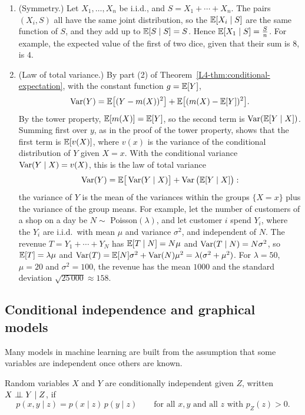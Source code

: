 \begin{example}\label{L4-ex:total-variance}
    \begin{enumerate}
        \item (Symmetry.) Let $X_1, \ldots, X_n$ be i.i.d., and $S = X_1 + \cdots + X_n$. The pairs $(X_i, S)$ all have the same joint distribution, so the $\mathbb{E}[X_i \mid S]$ are the same function of $S$, and they add up to $\mathbb{E}[S \mid S] = S$. Hence $\mathbb{E}[X_1 \mid S] = \frac{S}{n}$. For example, the expected value of the first of two dice, given that their sum is $8$, is $4$.
        \item (Law of total variance.) By part (2) of Theorem~\ref{L4-thm:conditional-expectation}, with the constant function $g = \mathbb{E}[Y]$,
        \[\operatorname{Var}(Y) = \mathbb{E}\big[(Y - m(X))^2\big] + \mathbb{E}\big[(m(X) - \mathbb{E}[Y])^2\big].\]
        By the tower property, $\mathbb{E}[m(X)] = \mathbb{E}[Y]$, so the second term is $\operatorname{Var}(\mathbb{E}[Y \mid X])$. Summing first over $y$, as in the proof of the tower property, shows that the first term is $\mathbb{E}[v(X)]$, where $v(x)$ is the variance of the conditional distribution of $Y$ given $X = x$. With the conditional variance $\operatorname{Var}(Y \mid X) = v(X)$, this is the law of total variance
        \[\operatorname{Var}(Y) = \mathbb{E}\big[\operatorname{Var}(Y \mid X)\big] + \operatorname{Var}\big(\mathbb{E}[Y \mid X]\big):\]
        the variance of $Y$ is the mean of the variances within the groups $\{X = x\}$ plus the variance of the group means. For example, let the number of customers of a shop on a day be $N \sim$ Poisson$(\lambda)$, and let customer $i$ spend $Y_i$, where the $Y_i$ are i.i.d.\ with mean $\mu$ and variance $\sigma^2$, and independent of $N$. The revenue $T = Y_1 + \cdots + Y_N$ has $\mathbb{E}[T \mid N] = N\mu$ and $\operatorname{Var}(T \mid N) = N\sigma^2$, so $\mathbb{E}[T] = \lambda\mu$ and $\operatorname{Var}(T) = \mathbb{E}[N]\sigma^2 + \operatorname{Var}(N)\mu^2 = \lambda(\sigma^2 + \mu^2)$. For $\lambda = 50$, $\mu = 20$ and $\sigma^2 = 100$, the revenue has the mean $1000$ and the standard deviation $\sqrt{25\,000} \approx 158$.
    \end{enumerate}
\end{example}

\subsection{Conditional independence and graphical models}\label{L4-sec:conditional-independence}

Many models in machine learning are built from the assumption that some variables are independent once others are known.

\begin{definition}\label{L4-def:conditional-independence}
    Random variables $X$ and $Y$ are conditionally independent given $Z$, written $X \perp\!\!\!\perp Y \mid Z$, if
    \[p(x, y \mid z) = p(x \mid z)\,p(y \mid z) \qquad \text{for all } x, y \text{ and all } z \text{ with } p_Z(z) > 0.\]
\end{definition}

